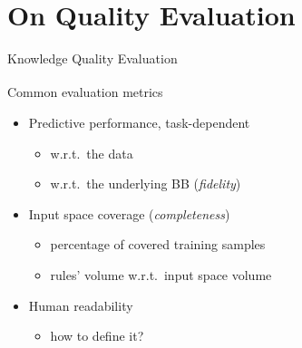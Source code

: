 \documentclass{beamer}
\newcommand{\tcite}[1]{\textsuperscript{\textcolor{Gold}{\tiny\cite{#1}}}}
\newcommand{\eg}{\item[e.g.]}
\newcommand{\no}{\item[\ding{56}]}
\begin{document}
\section{On Quality Evaluation}

\begin{frame}[c]{Knowledge Quality Evaluation}
	\vfill
	\begin{block}{Common evaluation metrics~\tcite{garcez2001symbolic,tran2013knowledge}}
		\medskip
		\begin{itemize}
			\item Predictive performance, task-dependent
			\begin{itemize}
				\eg w.r.t.\ the data
				\eg w.r.t.\ the underlying BB (\emph{fidelity})
			\end{itemize}
			\medskip
			\item Input space coverage (\emph{completeness})
			\begin{itemize}
				\eg percentage of covered training samples
				\eg rules' volume w.r.t.\ input space volume
			\end{itemize}
			\medskip
			\item Human readability
			\begin{itemize}
				\no how to define it?
			\end{itemize}
		\end{itemize}
		\medskip
	\end{block}
	\vfill
\end{frame}
\end{document}
